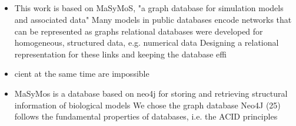 	\subsection{\masymos}
	\begin{itemize}
	\item This work is based on MaSyMoS, "a graph database for simulation models and associated data" \cite{Henkel2015}
		\subitem \cite{Henkel2015} Many models in public databases encode networks that can be represented as graphs
		\subitem \cite{Henkel2015} relational databases were developed for homogeneous, structured data, e.g. numerical data
		\subitem \cite{Henkel2015} Designing a relational representation for these links and keeping the database effi\item cient at the same time are impossible
	
	\item \cite{Henkel2015} MaSyMos is a database based on neo4j for storing and retrieving structural information of biological models
		\subitem \cite{Henkel2015} We chose the graph database Neo4J (25)
		\subitem \cite{Henkel2015} follows the fundamental properties of databases, i.e. the ACID principles
		

\end{itemize}
